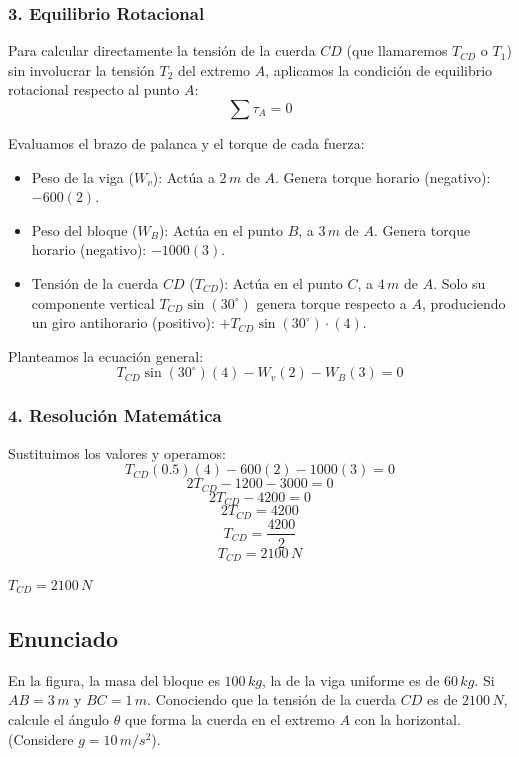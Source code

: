 \documentclass[12pt, a4paper]{article}
\begin{document}
\subsubsection*{3. Equilibrio Rotacional}
Para calcular directamente la tensión de la cuerda $CD$ (que llamaremos $T_{CD}$ o $T_1$) sin involucrar la tensión $T_2$ del extremo $A$, aplicamos la condición de equilibrio rotacional respecto al punto $A$:
$$\sum \tau_A = 0$$

Evaluamos el brazo de palanca y el torque de cada fuerza:
\begin{itemize}
    \item Peso de la viga ($W_v$): Actúa a $2 \, \si{m}$ de $A$. Genera torque horario (negativo): $-600(2)$.
    \item Peso del bloque ($W_B$): Actúa en el punto $B$, a $3 \, \si{m}$ de $A$. Genera torque horario (negativo): $-1000(3)$.
    \item Tensión de la cuerda $CD$ ($T_{CD}$): Actúa en el punto $C$, a $4 \, \si{m}$ de $A$. Solo su componente vertical $T_{CD} \sin(30^\circ)$ genera torque respecto a $A$, produciendo un giro antihorario (positivo): $+T_{CD} \sin(30^\circ) \cdot (4)$.
\end{itemize}

Planteamos la ecuación general:
$$T_{CD} \sin(30^\circ)(4) - W_v(2) - W_B(3) = 0$$

\subsubsection*{4. Resolución Matemática}
Sustituimos los valores y operamos:
$$T_{CD} (0.5)(4) - 600(2) - 1000(3) = 0$$
$$2 T_{CD} - 1200 - 3000 = 0$$
$$2 T_{CD} - 4200 = 0$$
$$2 T_{CD} = 4200$$
$$T_{CD} = \frac{4200}{2}$$
$$T_{CD} = 2100 \, \si{N}$$

\begin{tcolorbox}[colback=green!5!white, colframe=green!50!black, title=Respuesta Final]
\centering \Large $T_{CD} = 2100 \, \si{N}$
\end{tcolorbox}

\newpage

\subsection*{Enunciado}
En la figura, la masa del bloque es $100 \, \si{kg}$, la de la viga uniforme es de $60 \, \si{kg}$. Si $AB = 3 \, \si{m}$ y $BC = 1 \, \si{m}$. Conociendo que la tensión de la cuerda $CD$ es de $2100 \, \si{N}$, calcule el ángulo $\theta$ que forma la cuerda en el extremo $A$ con la horizontal. (Considere $g=10\,\si{m/s^2}$).
\end{document}

